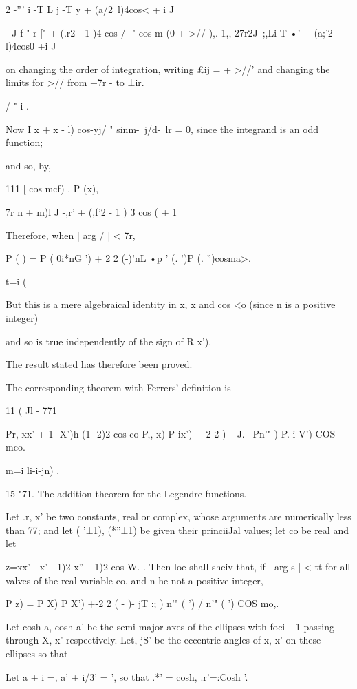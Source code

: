 {{{2 -''' i -T L j -T y + (a/2\ l)4cos< + i J

- J f " r [" + (.r2 - 1 )4 cos /- " cos m (0 + >// ),. 1,, 27r2J\
;,Li-T •' + (a;'2-l)4cos0 +i J

on changing the order of integration, writing £ij = + >//' and
changing the limits for >// from +7r - to ±ir.

%
%

/ " i .

Now I x + x - l) cos-yj/ " sinm-\ j/d-\ lr = 0, since the integrand is
an odd function;

and so, by,

111 [ cos mcf) . P (x),

7r n + m)l J -,r' + (,f'2 - 1 ) 3 cos ( + 1

Therefore, when | arg / | < 7r,

P ( ) = P ( 0i*nG ') + 2 2 (-)'nL •p ' (. ')P (. '')cosma>.

 t=i (%

But this is a mere algebraical identity in x, x and cos <o (since n is
a positive integer)

and so is true independently of the sign of R x').

The result stated has therefore been proved.

The corresponding theorem with Ferrers' definition is

11 ( Jl - 771

Pr, xx' + 1 -X')h (1- 2)2 cos co P,, x) P ix') + 2 2 )- ~J.-\ Pn'" )
P. i-V') COS mco.

m=i li-i-jn) .

15 "71. The addition theorem for the Legendre functions.

Let .r, x' be two constants, real or complex, whose arguments are
numerically less than 77; and let ( '±1), (*''±1) be given their
princiiJal values; let co be real and let

z=xx' - x' - 1)2 x'' ~ 1)2 cos W. . Then loe shall sheiv that, if |
arg s | < tt for all valves of the real variable co, and n he not a
positive integer,

P z) = P X) P X') +-2 2 ( - )- jT :; ) n'" ( ') / n'" ( ') COS mo,.

Let cosh a, cosh a' be the semi-major axes of the ellipses with foci
+1 passing through X, x' respectively. Let, jS' be the eccentric
angles of x, x' on these ellipses so that

Let a + i =, a' + i/3' = ', so that .*' = cosh, .r'=:Cosh '.

}}}
